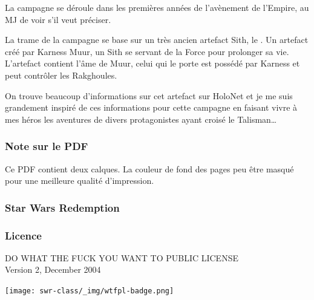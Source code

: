 \documentclass{jdrp}
\begin{document}
	La campagne se déroule dans les premières années de l’avènement de l’Empire, au MJ de voir s’il veut préciser.

	La trame de la campagne se base sur un très ancien artefact Sith, le . Un artefact créé par Karness Muur, un Sith se servant de la Force pour prolonger sa vie. L’artefact contient l’âme de Muur, celui qui le porte est possédé par Karness et peut contrôler les Rakghoules.


	On trouve beaucoup d’informations sur cet artefact sur HoloNet et je me suis grandement inspiré de ces informations pour cette campagne en faisant vivre à mes héros les aventures de divers protagonistes ayant croisé le Talisman\ldots

    \subsubsection{Note sur le PDF}

    Ce PDF contient deux calques. La couleur de fond des pages peu être masqué pour une meilleure qualité d’impression.

	\subsubsection{Star Wars Redemption}
	\cite{jdrp-starwars}

	\subsubsection{Licence}
	\noindent DO WHAT THE FUCK YOU WANT TO PUBLIC LICENSE\\
    Version 2, December 2004
    \vspace{-2.5\baselineskip}
	\begin{flushright}
		\texttt{[image: swr-class/\_img/wtfpl-badge.png]}
	\end{flushright}

	\twocolumn

	
	
	
	
	
	
	

	\onecolumn
	\nocite{*}
	\printbibliography
\end{document}
